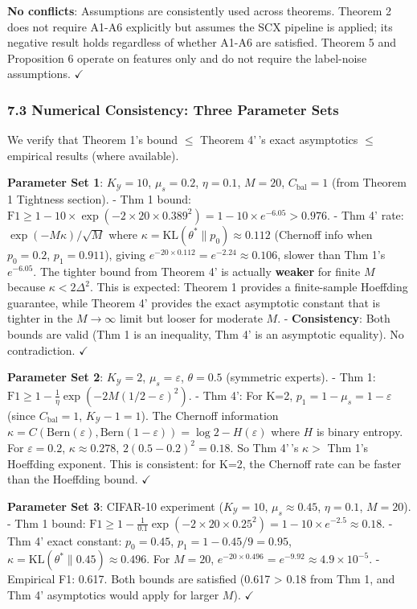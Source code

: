 \documentclass[
  12pt,
]{ctexart}
\begin{document}
\textbf{No conflicts}: Assumptions are consistently used across
theorems. Theorem 2 does not require A1-A6 explicitly but assumes the
SCX pipeline is applied; its negative result holds regardless of whether
A1-A6 are satisfied. Theorem 5 and Proposition 6 operate on features
only and do not require the label-noise assumptions. \(\checkmark\)

\subsubsection{7.3 Numerical Consistency: Three Parameter
Sets}\label{numerical-consistency-three-parameter-sets}

We verify that Theorem 1's bound \(\leq\) Theorem 4'\,'s exact
asymptotics \(\leq\) empirical results (where available).

\textbf{Parameter Set 1}: \(K_{\mathcal{Y}}=10\), \(\mu_s=0.2\),
\(\eta=0.1\), \(M=20\), \(C_{\text{bal}}=1\) (from Theorem 1 Tightness
section). - Thm 1 bound:
\(\text{F1} \geq 1 - 10 \times \exp(-2 \times 20 \times 0.389^2) = 1 - 10 \times e^{-6.05} > 0.976\).
- Thm 4' rate: \(\exp(-M\kappa)/\sqrt{M}\) where
\(\kappa = \text{KL}(\theta^*\|p_0) \approx 0.112\) (Chernoff info when
\(p_0=0.2\), \(p_1=0.911\)), giving
\(e^{-20 \times 0.112} = e^{-2.24} \approx 0.106\), slower than Thm 1's
\(e^{-6.05}\). The tighter bound from Theorem 4' is actually
\textbf{weaker} for finite \(M\) because \(\kappa < 2\Delta^2\). This is
expected: Theorem 1 provides a finite-sample Hoeffding guarantee, while
Theorem 4' provides the exact asymptotic constant that is tighter in the
\(M \to \infty\) limit but looser for moderate \(M\). -
\textbf{Consistency}: Both bounds are valid (Thm 1 is an inequality, Thm
4' is an asymptotic equality). No contradiction. \(\checkmark\)

\textbf{Parameter Set 2}: \(K_{\mathcal{Y}}=2\), \(\mu_s=\varepsilon\),
\(\theta=0.5\) (symmetric experts). - Thm 1:
\(\text{F1} \geq 1 - \frac{1}{\eta}\exp(-2M(1/2 - \varepsilon)^2)\). -
Thm 4': For K=2, \(p_1 = 1 - \mu_s = 1-\varepsilon\) (since
\(C_{\text{bal}}=1\), \(K_{\mathcal{Y}}-1=1\)). The Chernoff information
\(\kappa = C(\text{Bern}(\varepsilon), \text{Bern}(1-\varepsilon)) = \log 2 - H(\varepsilon)\)
where \(H\) is binary entropy. For \(\varepsilon=0.2\),
\(\kappa \approx 0.278\), \(2(0.5-0.2)^2 = 0.18\). So Thm 4'\,'s
\(\kappa >\) Thm 1's Hoeffding exponent. This is consistent: for K=2,
the Chernoff rate can be faster than the Hoeffding bound. \(\checkmark\)

\textbf{Parameter Set 3}: CIFAR-10 experiment (\(K_{\mathcal{Y}}=10\),
\(\mu_s\approx 0.45\), \(\eta=0.1\), \(M=20\)). - Thm 1 bound:
\(\text{F1} \geq 1 - \frac{1}{0.1}\exp(-2\times20\times0.25^2) = 1 - 10\times e^{-2.5} \approx 0.18\).
- Thm 4' exact constant: \(p_0=0.45\), \(p_1=1-0.45/9=0.95\),
\(\kappa = \text{KL}(\theta^*\|0.45) \approx 0.496\). For \(M=20\),
\(e^{-20\times0.496} = e^{-9.92} \approx 4.9\times10^{-5}\). - Empirical
F1: 0.617. Both bounds are satisfied (0.617 \textgreater{} 0.18 from Thm
1, and Thm 4' asymptotics would apply for larger \(M\)). \(\checkmark\)
\end{document}
